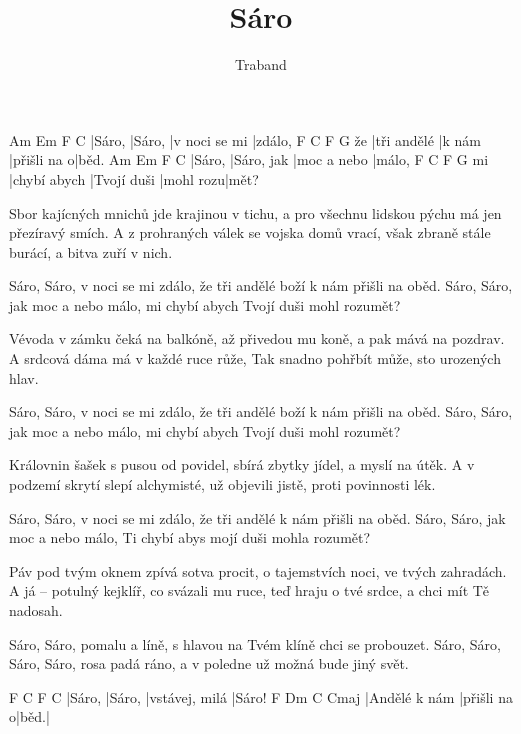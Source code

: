 \documentclass{song}
\title{Sáro}
\author{Traband}
\begin{document}
\begin{multicols}{2}

\strophe
Am     Em     F             C
|Sáro, |Sáro, |v noci se mi |zdálo,
   F           C      F           G
že |tři andělé |k nám |přišli na o|běd.
Am     Em         F           C
|Sáro, |Sáro, jak |moc a nebo |málo,
   F            C           F         G
mi |chybí abych |Tvojí duši |mohl rozu|mět?
\endstrophe

\strophe*
Sbor kajícných mnichů jde krajinou v tichu,
a pro všechnu lidskou pýchu má jen přezíravý smích.
A z prohraných válek se vojska domů vrací,
však zbraně stále burácí, a bitva zuří v nich.
\endstrophe

\strophe*
Sáro, Sáro, v noci se mi zdálo,
že tři andělé boží k nám přišli na oběd.
Sáro, Sáro, jak moc a nebo málo,
mi chybí abych Tvojí duši mohl rozumět?
\endstrophe

\strophe*
Vévoda v zámku čeká na balkóně,
až přivedou mu koně, a pak mává na pozdrav.
A srdcová dáma má v každé ruce růže,
Tak snadno pohřbít může, sto urozených hlav.
\endstrophe

\strophe*
Sáro, Sáro, v noci se mi zdálo,
že tři andělé boží k nám přišli na oběd.
Sáro, Sáro, jak moc a nebo málo,
mi chybí abych Tvojí duši mohl rozumět?
\endstrophe

\columnbreak

\strophe*
Královnin šašek s pusou od povidel,
sbírá zbytky jídel, a myslí na útěk.
A v podzemí skrytí slepí alchymisté,
už objevili jistě, proti povinnosti lék.
\endstrophe

\strophe*
Sáro, Sáro, v noci se mi zdálo,
že tři andělé k nám přišli na oběd.
Sáro, Sáro, jak moc a nebo málo,
Ti chybí abys mojí duši mohla rozumět?
\endstrophe

\strophe*
Páv pod tvým oknem zpívá sotva procit,
o tajemstvích noci, ve tvých zahradách.
A já -- potulný kejklíř, co svázali mu ruce,
teď hraju o tvé srdce, a chci mít Tě nadosah.
\endstrophe

\strophe*
Sáro, Sáro, pomalu a líně,
s hlavou na Tvém klíně chci se probouzet.
Sáro, Sáro, Sáro, Sáro, rosa padá ráno,
a v poledne už možná bude jiný svět.
\endstrophe

\strophe
F      C      F              C
|Sáro, |Sáro, |vstávej, milá |Sáro!
F             Dm          C    Cmaj\7
|Andělé k nám |přišli na o|běd.|
\endstrophe

\end{multicols}
\end{document}
